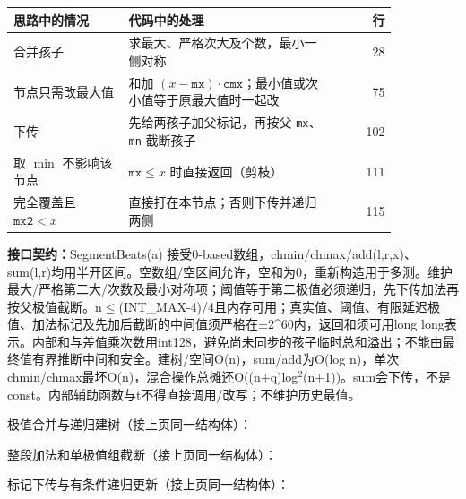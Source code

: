 \begin{center}\small
\begin{tabular}{@{}p{0.30\linewidth}p{0.55\linewidth}r@{}}
\toprule
思路中的情况 & 代码中的处理 & 行\\
\midrule
合并孩子 & 求最大、严格次大及个数，最小一侧对称 & 28\\
节点只需改最大值 & 和加 $(x-\texttt{mx})\cdot\texttt{cmx}$；最小值或次小值等于原最大值时一起改 & 75\\
下传 & 先给两孩子加父标记，再按父 \texttt{mx}、\texttt{mn} 截断孩子 & 102\\
取 $\min$ 不影响该节点 & $\texttt{mx}\le x$ 时直接返回（剪枝） & 111\\
完全覆盖且 $\texttt{mx2}<x$ & 直接打在本节点；否则下传并递归两侧 & 115\\
\bottomrule
\end{tabular}
\end{center}



{\sloppy{}\noindent\textbf{接口契约：}SegmentBeats(a) 接受0-based数组，chmin/chmax/add(l,r,x)、sum(l,r)均用半开区间。空数组/空区间允许，空和为0，重新构造用于多测。维护最大/严格第二大/次数及最小对称项；阈值等于第二极值必须递归，先下传加法再按父极值截断。n$\le$(INT\_MAX-4)/4且内存可用；真实值、阈值、有限延迟极值、加法标记及先加后截断的中间值须严格在±2\textasciicircum{}60内，返回和须可用long long表示。内部和与差值乘次数用int128，避免尚未同步的孩子临时总和溢出；不能由最终值有界推断中间和安全。建树/空间O(n)，sum/add为O(log n)，单次chmin/chmax最坏O(n)，混合操作总摊还O((n+q)log$^{2}$(n+1))。sum会下传，不是const。内部辅助函数与t不得直接调用/改写；不维护历史最值。\par}

\Needspace{307pt}



\newpage

\noindent 极值合并与递归建树（接上页同一结构体）：



\newpage

\noindent 整段加法和单极值组截断（接上页同一结构体）：



\newpage

\noindent 标记下传与有条件递归更新（接上页同一结构体）：

